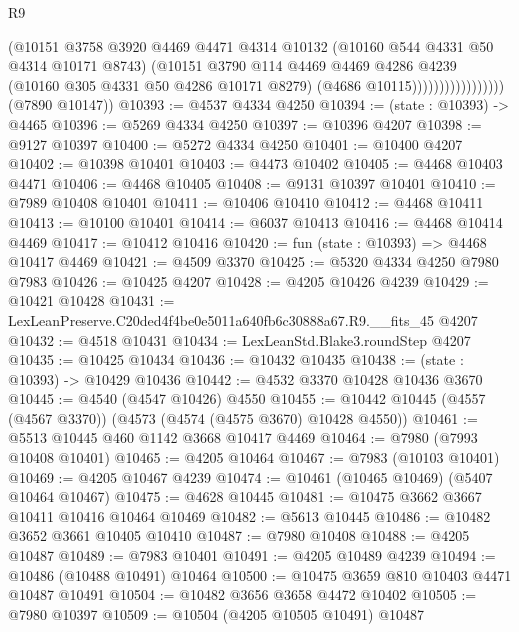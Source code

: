 \begin{lexlean}{R9}
\begin{coremodule}
                                  (@10151
                                    @3758
                                    @3920
                                    @4469
                                    @4471
                                    @4314
                                    @10132
                                    (@10160 @544 @4331 @50 @4314 @10171 @8743)
                                    (@10151
                                      @3790
                                      @114
                                      @4469
                                      @4469
                                      @4286
                                      @4239
                                      (@10160 @305 @4331 @50 @4286 @10171 @8279)
                                      (@4686 @10115)))))))))))))))))
      (@7890 @10147))
@10393 := @4537 @4334 @4250
@10394 := (state : @10393) -> @4465
@10396 := @5269 @4334 @4250
@10397 := @10396 @4207
@10398 := @9127 @10397
@10400 := @5272 @4334 @4250
@10401 := @10400 @4207
@10402 := @10398 @10401
@10403 := @4473 @10402
@10405 := @4468 @10403 @4471
@10406 := @4468 @10405
@10408 := @9131 @10397 @10401
@10410 := @7989 @10408 @10401
@10411 := @10406 @10410
@10412 := @4468 @10411
@10413 := @10100 @10401
@10414 := @6037 @10413
@10416 := @4468 @10414 @4469
@10417 := @10412 @10416
@10420 := fun (state : @10393) => @4468 @10417 @4469
@10421 := @4509 @3370
@10425 := @5320 @4334 @4250 @7980 @7983
@10426 := @10425 @4207
@10428 := @4205 @10426 @4239
@10429 := @10421 @10428
@10431 := LexLeanPreserve.C20ded4f4be0e5011a640fb6c30888a67.R9.__fits_45 @4207
@10432 := @4518 @10431
@10434 := LexLeanStd.Blake3.roundStep @4207
@10435 := @10425 @10434
@10436 := @10432 @10435
@10438 := (state : @10393) -> @10429 @10436
@10442 := @4532 @3370 @10428 @10436 @3670
@10445 := @4540 (@4547 @10426) @4550
@10455 := @10442 @10445 (@4557 (@4567 @3370)) (@4573 (@4574 (@4575 @3670) @10428 @4550))
@10461 := @5513 @10445 @460 @1142 @3668 @10417 @4469
@10464 := @7980 (@7993 @10408 @10401)
@10465 := @4205 @10464
@10467 := @7983 (@10103 @10401)
@10469 := @4205 @10467 @4239
@10474 := @10461 (@10465 @10469) (@5407 @10464 @10467)
@10475 := @4628 @10445
@10481 := @10475 @3662 @3667 @10411 @10416 @10464 @10469
@10482 := @5613 @10445
@10486 := @10482 @3652 @3661 @10405 @10410
@10487 := @7980 @10408
@10488 := @4205 @10487
@10489 := @7983 @10401
@10491 := @4205 @10489 @4239
@10494 := @10486 (@10488 @10491) @10464
@10500 := @10475 @3659 @810 @10403 @4471 @10487 @10491
@10504 := @10482 @3656 @3658 @4472 @10402
@10505 := @7980 @10397
@10509 := @10504 (@4205 @10505 @10491) @10487

\end{coremodule}
\end{lexlean}
